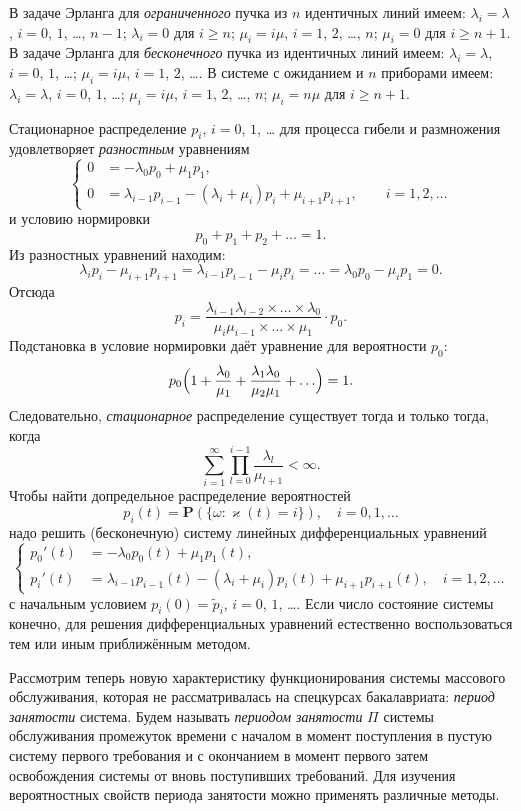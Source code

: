 \documentclass[12pt]{extarticle}
\renewcommand{\Pr}{{\mathbf P}}
\begin{document}
В задаче Эрланга для \emph{ограниченного} пучка из $n$ идентичных линий имеем:
$\lambda_i=\lambda$, $i=0$, $1$, \ldots, $n-1$; $\lambda_i=0$ для $i\geqslant
n$; $\mu_i=i\mu$, $i=1$, $2$, \ldots, $n$; $\mu_i=0$ для $i\geqslant n+1$.  В
задаче Эрланга для \emph{бесконечного} пучка из идентичных линий имеем:
$\lambda_i=\lambda$, $i=0$, $1$, \ldots; $\mu_i=i\mu$, $i=1$, $2$, \ldots.  В
системе с ожиданием и $n$ приборами имеем: $\lambda_i=\lambda$, $i=0$, $1$,
\ldots;  $\mu_i=i\mu$, $i=1$, $2$,
\ldots, $n$; $\mu_i=n\mu$ для $i\geqslant n+1$.

Стационарное распределение $p_i$, $i=0$, $1$, \ldots{} для процесса гибели и
размножения удовлетворяет \emph{разностным} уравнениям
\[
  \left\{
    \begin{aligned}
      0&= -\lambda_0 p_0+\mu_1 p_1,\\
      0&= \lambda_{i-1}p_{i-1}-(\lambda_i+\mu_i)p_i+\mu_{i+1}p_{i+1}, \qquad
      i=1, 2, \ldots{}
    \end{aligned}
  \right.
\]
и условию нормировки
\[
p_0+p_1+p_2+\ldots=1.
\]
Из разностных уравнений находим:
\[
\lambda_{i}p_{i}-\mu_{i+1}p_{i+1}=\lambda_{i-1}p_{i-1}-\mu_{i}p_{i}=\ldots =
\lambda_0 p_0-\mu_i p_1=0.
\]
Отсюда
\[
p_i=\dfrac{\lambda_{i-1}\lambda_{i-2}\times\ldots\times\lambda_0}{\mu_i\mu_{i-1}\times\ldots\times
\mu_1}\cdot p_0.
\]
Подстановка в условие нормировки даёт уравнение для вероятности $p_0$:
\[
p_0 \Bigl(1+\dfrac{\lambda_0}{\mu_1}+\dfrac{\lambda_1\lambda_0}{\mu_2\mu_1}+\ldots
\Bigr)=1.
\]
Следовательно, \emph{стационарное} распределение существует тогда и только тогда, когда
\[
\sum_{i=1}^\infty \prod_{l=0}^{i-1} \dfrac{\lambda_l}{\mu_{l+1}}<\infty.
\]
Чтобы найти допредельное распределение вероятностей
\[
p_i(t)=\Pr(\{\omega\colon \varkappa(t)=i\}), \quad i=0, 1, \ldots
\]
надо решить (бесконечную) систему линейных дифференциальных уравнений
\[
\left\{
  \begin{aligned}
  p_0'(t)&=-\lambda_0 p_0(t)+\mu_1p_1(t),\\
  p_i'(t)&=\lambda_{i-1}p_{i-1}(t)-(\lambda_i+\mu_i)
  p_i(t)+\mu_{i+1}p_{i+1}(t),\quad
   i=1, 2, \ldots
 \end{aligned}
\right.
\]
с начальным условием $p_i(0)=\tilde{p}_i$, $i=0$, $1$, \ldots. Если число
состояние системы конечно, для решения дифференциальных уравнений естественно
воспользоваться тем или иным приближённым методом.

Рассмотрим теперь новую характеристику функционирования системы массового
обслуживания, которая не рассматривалась на спецкурсах бакалавриата:
\emph{период занятости} система. Будем называть \emph{периодом занятости} $\Pi$
системы обслуживания промежуток времени с началом в момент поступления в пустую
систему первого требования и с окончанием в момент первого затем освобождения
системы от вновь поступивших требований. Для изучения вероятностных свойств
периода занятости можно применять различные методы.
\end{document}
